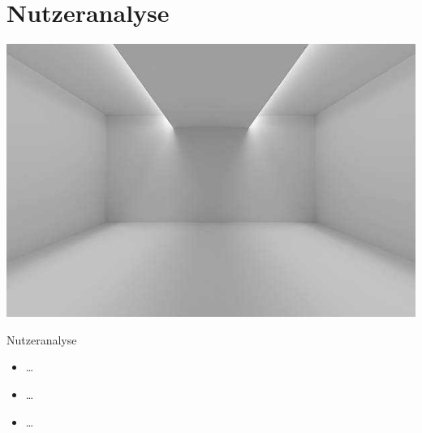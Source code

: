 \documentclass[presentation,bigger,aspectratio=169]{beamer}
\begin{document}
\section{Nutzeranalyse}
\label{sec:org1d7ab54}
\begin{frame}[label={sec:orgc23eac9}]{\MakeUppercase{\insertsection}}
\begin{center}
\begin{center}
\includegraphics[height=0.77\textheight]{./img/m1_praes_empty_01.jpg}
\label{fig:m1_praes_empty_01}
\end{center}
\end{center}
\end{frame}
\begin{frame}[label={sec:org7eebe61}]{Nutzeranalyse}
\begin{itemize}
\item \ldots{}
\item \ldots{}
\item \ldots{}
\end{itemize}
\end{frame}
\end{document}
